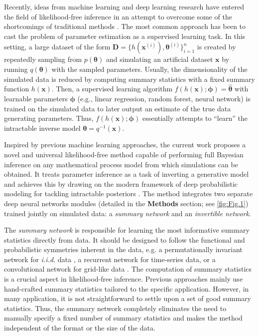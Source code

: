 \documentclass[9pt,twoside,lineno]{pnas-new}
\begin{document}
Recently, ideas from machine learning and deep learning research have entered the field of likelihood-free inference in an attempt to overcome some of the shortcomings of traditional methods \cite{radev2019towards, hwang2018conditional, mestdagh2018prepaid, raynal2018abc, jiang2017learning, lueckmann2017flexible, papamakarios2016fast}. The most common approach has been to cast the problem of parameter estimation as a supervised learning task. In this setting, a large dataset of the form $\boldsymbol{D} = \{h(\boldsymbol{x}^{(i)}), \boldsymbol{\theta}^{(i)}\}_{i=1}^{n}$ is created by repeatedly sampling from $p(\boldsymbol{\theta})$ and simulating an artificial dataset $\boldsymbol{x}$ by running $q(\boldsymbol{\theta})$ with the sampled parameters. Usually, the dimensionality of the simulated data is reduced by computing summary statistics  with a fixed summary function $h(\boldsymbol{x})$. Then, a supervised learning algorithm $f(h(\boldsymbol{x});\boldsymbol{\phi}) = \widehat{\boldsymbol{\theta}}$ with learnable parameters $\boldsymbol{\phi}$ (e.g., linear regression, random forest, neural network) is trained on the simulated data to later output an estimate of the true data generating parameters. Thus, $f(h(\boldsymbol{x});\boldsymbol{\phi})$ essentially attempts to “learn” the intractable inverse model $\boldsymbol{\theta} = q^{-1}(\boldsymbol{x})$.

Inspired by previous machine learning approaches, the current work proposes a novel and universal likelihood-free method capable of performing full Bayesian inference on any mathematical process model from which simulations can be obtained. It treats parameter inference as a task of inverting a generative model and achieves this by drawing on the modern framework of deep probabilistic modeling for tackling intractable posteriors \cite{ardizzone2018analyzing, kingma2018glow, grover2018flow, dinh2016density}. The method integrates two separate deep neural networks modules (detailed in the \textbf{Methods} section; see \autoref{fig:Fig.1}) trained jointly on simulated data: a \textit{summary network} and an \textit{invertible network}. 

The \textit{summary network} is responsible for learning the most informative summary statistics directly from data. It should be designed to follow the functional and probabilistic symmetries inherent in the data, e.g. a permutationally invariant network for \textit{i.i.d.} data \cite{bloem2019probabilistic}, a recurrent network for time-series data, or a convolutional network for grid-like data \cite{goodfellow2016deep}. The computation of summary statistics is a crucial aspect in likelihood-free inference. Previous approaches mainly use hand-crafted summary statistics tailored to the specific application. However, in many application, it is not straightforward to settle upon a set of good summary statistics. Thus, the summary network completely eliminates the need to manually specify a fixed number of summary statistics and makes the method independent of the format or the size of the data.
\end{document}
